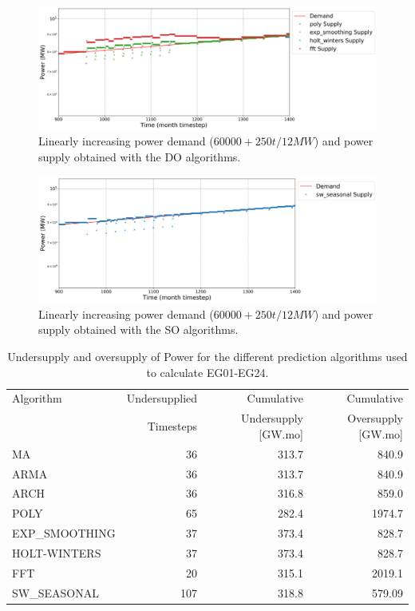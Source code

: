 \documentclass[11pt]{article}
\begin{document}
\begin{figure}[H]
	\centering
	\includegraphics[width=\textwidth]{24-figures/lin-24-power-buffer02.png} 
	\hfill
	\caption{Linearly increasing power demand ($60000 + 250t/12 MW$) and power supply obtained 
	with the DO algorithms.}
	\label{fig:24-lin-DO}
\end{figure}

\begin{figure}[H]
	\centering
	\includegraphics[width=\textwidth]{24-figures/lin-24-power-buffer03.png} 
	\hfill
	\caption{Linearly increasing power demand ($60000 + 250t/12 MW$) and power supply obtained with the SO algorithms.}
	\label{fig:24-lin-SO}
\end{figure}

\begin{table}[H]
	\centering
	\caption{Undersupply and oversupply of Power for the different prediction algorithms used to calculate EG01-EG24.}
	\label{tab:24-lin-power}
	\begin{tabularx}{\textwidth}{lRRR}
		\hline
		Algorithm & Undersupplied & Cumulative  & Cumulative \\
		& Timesteps     & Undersupply [GW.mo]  & Oversupply [GW.mo] \\ \hline
		MA        & 36 	& 313.7 & 840.9 \\ 
		ARMA      & 36 	& 313.7 & 840.9 \\ 
		ARCH      & 36 	& 316.8 & 859.0 \\ 
		POLY      &  65 & 282.4 & 1974.7 \\ 
		EXP\_SMOOTHING 	& 37 & 373.4 & 828.7 \\ 
		HOLT-WINTERS  	& 37 & 373.4 & 828.7 \\ 
		FFT       & 20	& 315.1	& 2019.1 \\ 
		SW\_SEASONAL    & 107 & 318.8 & 579.09 \\ \hline
	\end{tabularx}
\end{table}
\end{document}
